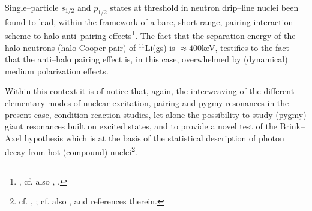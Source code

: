    
   
 Single--particle $s_{1/2}$ and $p_{1/2}$ states at threshold in neutron drip--line nuclei been found to lead, within the framework of a bare, short range, pairing interaction scheme to halo anti--pairing effects\footnote{\citet{Bennaceur:00}, cf. also \citet{Hamamoto:03}, \citet{Hamamoto:04}.}. The fact that the separation energy of the halo neutrons (halo Cooper pair) of $^{11}$Li(gs) is $\approx 400$keV, testifies to the fact that the anti--halo pairing effect is, in this case, overwhelmed by (dynamical) medium polarization effects.
 
 Within this context it is of notice that, again, the interweaving of the different elementary modes of nuclear excitation, pairing and pygmy resonances in the present case, condition reaction studies, let alone the possibility to study (pygmy) giant resonances built on excited states, and to provide a novel test of the Brink--Axel hypothesis which is at the basis of the statistical description of photon decay from hot (compound) nuclei\footnote{cf. \cite{Axel:62}, \citet{Brink:55}; cf. also \citet{Bortignon:98}, \cite{Bertsch:86} and references therein.}. 
 
